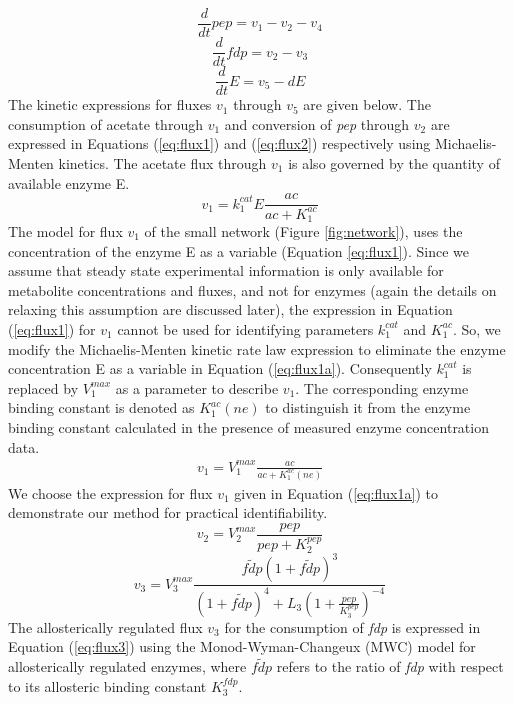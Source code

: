 \documentclass[10pt]{article}
\begin{document}
\begin{equation}\label{eq:ode1}
\frac{d}{dt}pep=v_1-v_2-v_4
\end{equation}
\begin{equation}\label{eq:ode2}
\frac{d}{dt}fdp=v_2-v_3
\end{equation}
\begin{equation}\label{eq:ode3}
\frac{d}{dt}E=v_5 - d E
\end{equation}
The kinetic expressions for fluxes $v_1$ through $v_5$ are given below. The consumption of acetate through $v_1$ and conversion of \textit{pep} through $v_2$ are expressed in Equations (\ref{eq:flux1}) and (\ref{eq:flux2}) respectively using Michaelis-Menten kinetics. The acetate flux through $v_1$ is also governed by the quantity of available enzyme E. 
\begin{equation}\label{eq:flux1}
v_1 = k_{1}^{cat}E\frac{ac}{ac+K_{1}^{ac}}
\end{equation}		
The model for flux $v_1$ of the small network (Figure \ref{fig:network}), uses the concentration of the enzyme E as a variable (Equation \ref{eq:flux1}). Since we assume that steady state experimental information is only available for metabolite concentrations and fluxes, and not for enzymes (again the details on relaxing this assumption are discussed later), the expression in Equation (\ref{eq:flux1}) for $v_1$ cannot be used for identifying parameters $k_1^{cat}$ and $K_1^{ac}$. So, we modify the Michaelis-Menten kinetic rate law expression to eliminate the enzyme concentration E as a variable in Equation (\ref{eq:flux1a}). Consequently $k_1^{cat}$ is replaced by $V_1^{max}$ as a parameter to describe $v_1$. The corresponding enzyme binding constant is denoted as $K_1^{ac} (ne)$ to distinguish it from the enzyme binding constant calculated in the presence of measured enzyme concentration data.
\begin{align}\label{eq:flux1a}
v_1 = V_1^{max}\frac{ac}{ac+K_{1}^{ac}(ne)}
\end{align}		
We choose the expression for flux $v_1$ given in Equation (\ref{eq:flux1a}) to demonstrate our method for practical identifiability. 	
\begin{equation}\label{eq:flux2}
v_2 = V_{2}^{max}\frac{pep}{pep+K_{2}^{pep}}
\end{equation}
\begin{equation}\label{eq:flux3}
v_3 = V_{3}^{max}\frac{\tilde{fdp}\left(1+\tilde{fdp}\right)^3}{\left(1+\tilde{fdp}\right)^4+L_3\left(1+\frac{pep}{K_{3}^{pep}}\right)^{-4}}
\end{equation}
The allosterically regulated flux $v_3$ for the consumption of \textit{fdp} is expressed in Equation (\ref{eq:flux3}) using the Monod-Wyman-Changeux (MWC) model for allosterically regulated enzymes, where $\tilde{fdp}$ refers to the ratio of \textit{fdp} with respect to its allosteric binding constant $K_{3}^{fdp}$. 
\end{document}
